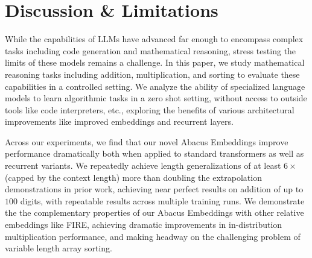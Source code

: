 \documentclass{article}
\begin{document}
 
\section{Discussion \& Limitations}
\label{sec:discussion}
While the capabilities of LLMs have advanced far enough to encompass complex tasks including code generation and mathematical reasoning, stress testing the limits of these models remains a challenge.
In this paper, we study mathematical reasoning tasks including addition, multiplication, and sorting to evaluate these capabilities in a controlled setting.
We analyze the ability of specialized language models to learn algorithmic tasks in a zero shot setting, without access to outside tools like code interpreters, etc., exploring the benefits of various architectural improvements like improved embeddings and recurrent layers.

Across our experiments, we find that our novel Abacus Embeddings improve performance dramatically both when applied to standard transformers as well as recurrent variants. 
We repeatedly achieve length generalizations of at least $6\times$ (capped by the context length) more than doubling the extrapolation demonstrations in prior work, achieving near perfect results on addition of up to $100$ digits, with repeatable results across multiple training runs.
We demonstrate the the complementary properties of our Abacus Embeddings with other relative embeddings like FIRE, achieving dramatic improvements in in-distribution multiplication performance, and making headway on the challenging problem of variable length array sorting.
\end{document}
